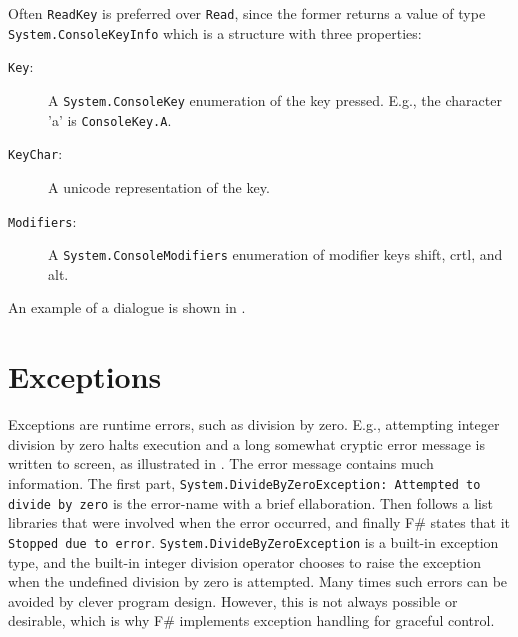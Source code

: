 \documentclass[fsharpNotes.tex]{subfiles}
\begin{document}
Often \lstinline{ReadKey} is preferred over \lstinline{Read}, since the former returns a value of type \lstinline!System.ConsoleKeyInfo! which is a structure with three properties: %
%
%
%
\begin{description}
\item[\texttt{Key}:] A \lstinline{System.ConsoleKey} enumeration of the key pressed. E.g., the character 'a' is \lstinline{ConsoleKey.A}.
\item[\texttt{KeyChar}:] A unicode representation of the key.
\item[\texttt{Modifiers}:] A \lstinline{System.ConsoleModifiers} enumeration of modifier keys shift, crtl, and alt.
\end{description}
An example of a dialogue is shown in .
%
%

\section{Exceptions}
\label{sec:exceptions}
Exceptions are runtime errors, such as division by zero. E.g., attempting integer division by zero halts execution and a long somewhat cryptic error message is written to screen, as illustrated in .
%
%
The error message contains much information. The first part, \lstinline[language=console]{System.DivideByZeroException: Attempted to divide by zero} is the error-name with a brief ellaboration. Then follows a list libraries that were involved when the error occurred, and finally F\# states that it \lstinline[language=console]{Stopped due to error}. \lstinline{System.DivideByZeroException} is a built-in exception type, and the built-in integer division operator chooses to raise the exception when the undefined division by zero is attempted. Many times such errors can be avoided by clever program design. However, this is not always possible or desirable, which is why F\# implements exception handling for graceful control.
\end{document}
